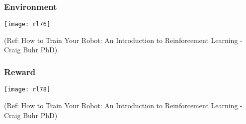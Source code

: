 
\begin{frame}[fragile]\frametitle{Environment}


\begin{center}
\texttt{[image: rl76]}
\end{center}

{\tiny (Ref: How to Train Your Robot: An Introduction to Reinforcement Learning - Craig Buhr PhD)}

\end{frame}






\begin{frame}[fragile]\frametitle{Reward}


\begin{center}
\texttt{[image: rl78]}
\end{center}

{\tiny (Ref: How to Train Your Robot: An Introduction to Reinforcement Learning - Craig Buhr PhD)}

\end{frame}




